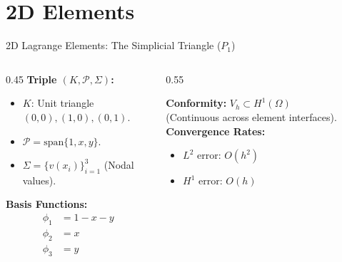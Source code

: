 \documentclass[aspectratio=169]{beamer}
\begin{document}
\section{2D Elements}

\begin{frame}{2D Lagrange Elements: The Simplicial Triangle ($P_1$)}
    \begin{columns}
        \begin{column}{0.45\textwidth}
            \textbf{Triple $(K, \mathcal{P}, \Sigma)$:}
            \begin{itemize}
                \item $K$: Unit triangle $(0,0), (1,0), (0,1)$.
                \item $\mathcal{P} = \text{span}\{1, x, y\}$.
                \item $\Sigma = \{ v(x_i) \}_{i=1}^3$ (Nodal values).
            \end{itemize}
            \textbf{Basis Functions:}
            \begin{align*}
                \phi_1 &= 1 - x - y \\
                \phi_2 &= x \\
                \phi_3 &= y
            \end{align*}
        \end{column}
        \begin{column}{0.55\textwidth}
            \begin{center}
            \end{center}
            \textbf{Conformity:} $V_h \subset H^1(\Omega)$ \\
            (Continuous across element interfaces).
            \textbf{Convergence Rates:}
            \begin{itemize}
                \item $L^2$ error: $O(h^2)$
                \item $H^1$ error: $O(h)$
            \end{itemize}

        \end{column}
    \end{columns}
\end{frame}
\end{document}
